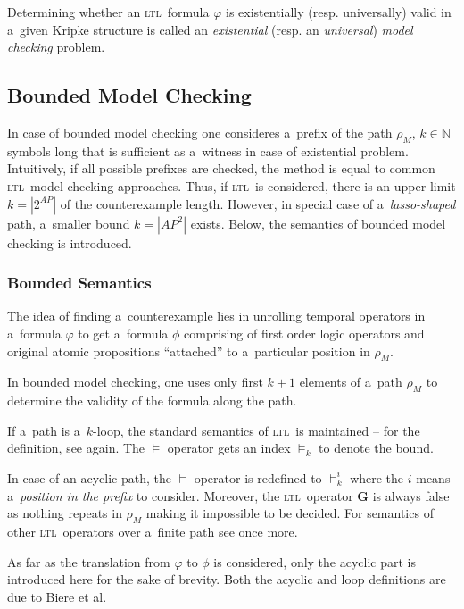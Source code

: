 \documentclass[12pt,oneside,draft]{fithesis}
\newcommand{\ltl}{\textsc{ltl}~}
\newcommand{\mNatural}{\mathbb{N}}
\newcommand{\bG}{\mathbf{G}}
\begin{document}
Determining whether an \ltl formula $\varphi$ is existentially (resp.
universally) valid in a~given Kripke structure is called an
\emph{existential} (resp. an \emph{universal}) \emph{model checking}
problem\cite{biere}.

\subsection{Bounded Model Checking}
In case of bounded model checking one consideres a~prefix of the path
$\rho_M$, $k\in\mNatural$ symbols long that is sufficient as a~witness
in case of existential problem\cite{biere}. Intuitively, if all
possible prefixes are checked, the method is equal to common \ltl model
checking approaches. Thus, if \ltl is considered, there is an upper
limit $k=|2^{AP}|$ of the counterexample length\cite{biere}. However, in
special case of a~\emph{lasso-shaped} path, a~smaller bound $k=|AP^2|$
exists\cite{biere}. Below, the semantics of bounded model checking is
introduced.

\subsubsection*{Bounded Semantics}
The idea of finding a~counterexample lies in unrolling temporal
operators in a~formula $\varphi$ to get a~formula $\phi$ comprising
of first order logic operators and original atomic propositions
``attached'' to a~particular position in $\rho_M$.

In bounded model checking, one uses only first $k+1$ elements of
a~path $\rho_M$ to determine the validity of the formula along the
path\cite{biere}.

If a~path is a~$k$-loop, the standard semantics of \ltl is maintained --
for the definition, see again\cite{biere}. The $\models$ operator gets
an index $\models_k$ to denote the bound.

In case of an acyclic path, the $\models$ operator is redefined to
$\models_k^i$ where the $i$ means a~\emph{position in the prefix} to
consider. Moreover, the \ltl operator $\bG$ is always false as nothing
repeats in $\rho_M$ making it impossible to be decided. For semantics
of other \ltl operators over a~finite path see once more\cite{biere}.

As far as the translation from $\varphi$ to $\phi$ is considered,
only the acyclic part is introduced here for the
sake of brevity. Both the acyclic and loop definitions are due to
Biere et al\cite{biere}.
\end{document}
